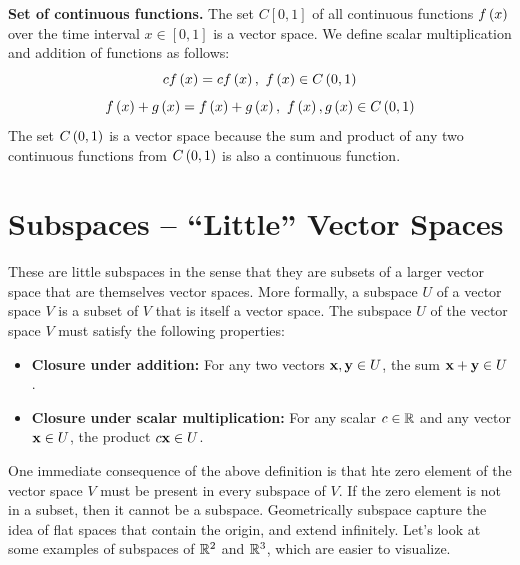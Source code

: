 \begin{example}
    \textbf{Set of continuous functions.} The set $C\left[0, 1\right]$ of all continuous functions $f\left( x\right)$ over the time interval $x \in \left[ 0, 1\right]$ is a vector space. We define scalar multiplication and addition of functions as follows:
    \[ c f\left( x \right) = c f\left( x \right), \,\, f\left( x \right) \in C\left( 0, 1 \right) \]
    \[ f\left( x \right) + g\left( x \right) = f\left( x \right) + g\left( x \right), \,\, f\left( x \right), g\left( x \right) \in C\left( 0, 1 \right) \]
    The set $C\left( 0, 1 \right)$ is a vector space because the sum and product of any two continuous functions from $C\left( 0, 1 \right)$ is also a continuous function.
\end{example}

\section{Subspaces -- ``Little'' Vector Spaces}
These are little subspaces in the sense that they are subsets of a larger vector space that are themselves vector spaces. More formally, a subspace $U$ of a vector space $V$ is a subset of $V$ that is itself a vector space. The subspace $U$ of the vector space $V$ must satisfy the following properties:
\begin{itemize}
    \item \textbf{Closure under addition:} For any two vectors $\mathbf{x}, \mathbf{y} \in U$, the sum $\mathbf{x} + \mathbf{y} \in U$.
    \item \textbf{Closure under scalar multiplication:} For any scalar $c \in \mathbb{R}$ and any vector $\mathbf{x} \in U$, the product $c\mathbf{x} \in U$.
\end{itemize}
One immediate consequence of the above definition is that hte zero element of the vector space $V$ must be present in every subspace of $V$. If the zero element is not in a subset, then it cannot be a subspace. Geometrically subspace capture the idea of flat spaces that contain the origin, and extend infinitely. Let's look at some examples of subspaces of $\mathbb{R}^2$ and $\mathbb{R}^3$, which are easier to visualize.

